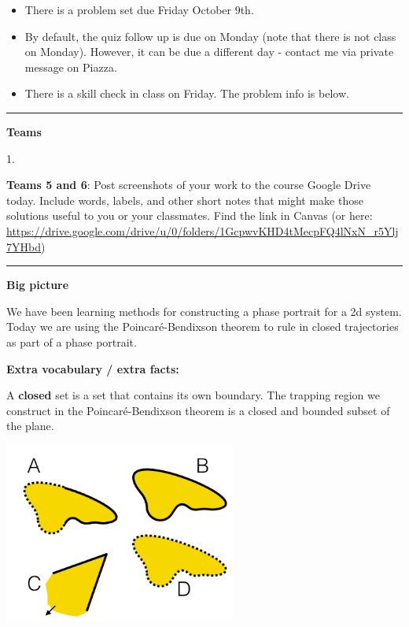 \documentclass[12pt,letterpaper,noanswers]{exam}
\begin{document}
 \pdfpageheight 11in 
  \pdfpagewidth 8.5in

\noindent 




\begin{itemize}
    \item There is a problem set due Friday October 9th.
    \item By default, the quiz follow up is due on Monday (note that there is not class on Monday).  However, it can be due a different day - contact me via private message on Piazza.
    \item There is a skill check in class on Friday.  The problem info is below.
\end{itemize}

\hrule
\vspace{0.2cm}





\noindent\textbf{Teams}

\begin{multicols}{2}
1. 
\end{multicols}

\noindent \textbf{Teams 5 and 6}: Post screenshots of your work to the course Google Drive today.  Include words, labels, and other short notes that might make those solutions useful to you or your classmates.  Find the link in Canvas (or here: \url{https://drive.google.com/drive/u/0/folders/1GcpwvKHD4tMecpFQ4lNxN_r5Ylj7YHbd})

\vspace{0.2cm}

\hrule
\vspace{0.2cm}

\noindent\textbf{Big picture}

We have been learning methods for constructing a phase portrait for a 2d system.  Today we are using the Poincar\'e-Bendixson theorem to rule in closed trajectories as part of a phase portrait.


\noindent \textbf{Extra vocabulary / extra facts:}
\begin{tcolorbox}
A \textbf{closed} set is a set that contains its own boundary.  The trapping region we construct in the Poincar\'e-Bendixson theorem is a closed and bounded subset of the plane.

\textbf{}
\end{tcolorbox}

\begin{center}
\includegraphics[width=3in]{img/C15p2.png}
\end{center}
\end{document}
